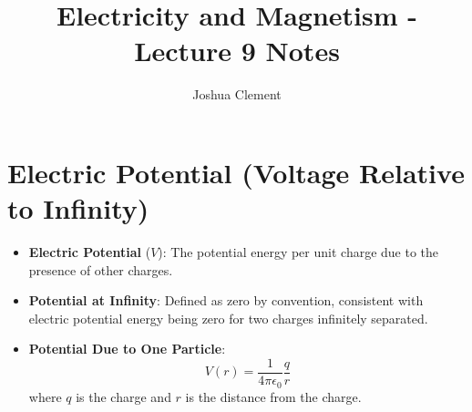 \documentclass{article}
\begin{document}
\title{Electricity and Magnetism - Lecture 9 Notes}
\author{Joshua Clement}
\maketitle

\section*{Electric Potential (Voltage Relative to Infinity)}
\begin{itemize}
    \item \textbf{Electric Potential} (\(V\)): The potential energy per unit charge due to the presence of other charges.
    \item \textbf{Potential at Infinity}: Defined as zero by convention, consistent with electric potential energy being zero for two charges infinitely separated.
    \item \textbf{Potential Due to One Particle}:
    \[
    V(r) = \frac{1}{4 \pi \epsilon_0} \frac{q}{r}
    \]
    where \(q\) is the charge and \(r\) is the distance from the charge.
\end{itemize}
\end{document}
